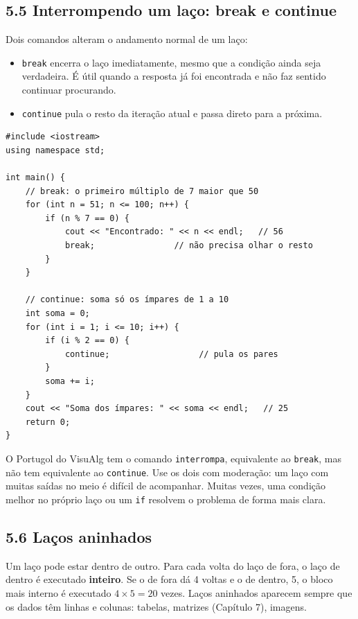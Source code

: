 \subsection{5.5 Interrompendo um laço: break e continue}

Dois comandos alteram o andamento normal de um laço:

\begin{itemize}
  \item \texttt{break} encerra o laço imediatamente, mesmo que a condição ainda seja verdadeira. É útil quando a resposta já foi encontrada e não faz sentido continuar procurando.
  \item \texttt{continue} pula o resto da iteração atual e passa direto para a próxima.
\end{itemize}

\begin{codigo}
\begin{Verbatim}[breaklines=true, breaksymbolleft={}, fontsize=\footnotesize]
#include <iostream>
using namespace std;

int main() {
    // break: o primeiro múltiplo de 7 maior que 50
    for (int n = 51; n <= 100; n++) {
        if (n % 7 == 0) {
            cout << "Encontrado: " << n << endl;   // 56
            break;                // não precisa olhar o resto
        }
    }

    // continue: soma só os ímpares de 1 a 10
    int soma = 0;
    for (int i = 1; i <= 10; i++) {
        if (i % 2 == 0) {
            continue;                  // pula os pares
        }
        soma += i;
    }
    cout << "Soma dos ímpares: " << soma << endl;   // 25
    return 0;
}
\end{Verbatim}
\end{codigo}

O Portugol do VisuAlg tem o comando \texttt{interrompa}, equivalente ao \texttt{break}, mas não tem equivalente ao \texttt{continue}. Use os dois com moderação: um laço com muitas saídas no meio é difícil de acompanhar. Muitas vezes, uma condição melhor no próprio laço ou um \texttt{if} resolvem o problema de forma mais clara.

\subsection{5.6 Laços aninhados}

Um laço pode estar dentro de outro. Para cada volta do laço de fora, o laço de dentro é executado \textbf{inteiro}. Se o de fora dá 4 voltas e o de dentro, 5, o bloco mais interno é executado $4 \times 5 = 20$ vezes. Laços aninhados aparecem sempre que os dados têm linhas e colunas: tabelas, matrizes (Capítulo 7), imagens.


